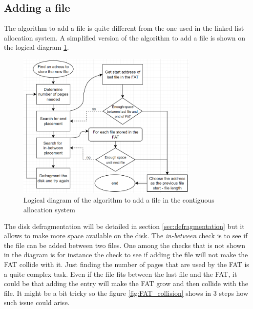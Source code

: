 \documentclass[10pt,a4paper]{ULBreport}
\begin{document}
\subsection{Adding a file}
The algorithm to add a file is quite different from the one used in the linked list allocation system. A simplified version of the algorithm to add a file is shown on the logical diagram \ref{fig:Logic_add_CA}.\\
\begin{figure}
    \centering
    \includegraphics[width=0.8\textwidth]{Logic_add_CA.png}
    \caption{Logical diagram of the algorithm to add a file in the contiguous allocation system}
    \label{fig:Logic_add_CA}
\end{figure}
The disk defragmentation will be detailed in section \ref{sec:defragmentation} but it allows to make more space available on the disk. The \textit{in-between} check is to see if the file can be added between two files.  
One among the checks that is not shown in the diagram is for instance the check to see if adding the file will not make the FAT collide with it. Just finding the number of pages that are used by the FAT is a quite complex task. Even if the file fits between the last file and the FAT, it could be that adding the entry will make the FAT grow and then collide with the file. It might be a bit tricky so the figure \ref{fig:FAT_collision} shows in 3 steps how such issue could arise. \\
\end{document}
